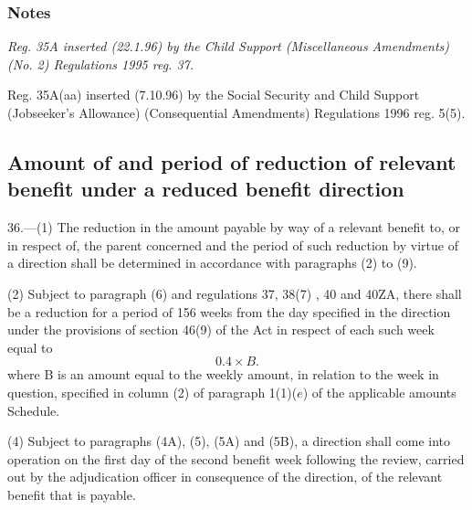 \documentclass[a4paper]{article}
\newcommand\amendment[1]{\subsubsection*{Notes}{\itshape\frenchspacing\footnotesize #1 \par}}
\begin{document}
\amendment{
Reg. 35A inserted (22.1.96) by the Child Support (Miscellaneous Amendments) (No. 2) Regulations 1995 reg. 37.

Reg. 35A(aa) inserted (7.10.96) by the Social Security and Child Support (Jobseeker's Allowance) (Consequential Amendments) Regulations 1996 reg. 5(5).
}

\subsection[36. Amount of and period of reduction of relevant benefit under a reduced benefit direction]{Amount of and period of reduction of relevant benefit under a reduced benefit direction}

36.—(1) The reduction in the amount payable by way of a relevant benefit to, or in respect of, the parent concerned and the period of such reduction by virtue of a direction shall be determined in accordance with paragraphs (2) to (9).

(2) Subject to paragraph (6) and regulations 37, 38(7)%
, 40 and 40ZA,  %
there shall be a reduction for a period of 
156 weeks  %
from the day specified in the direction under the provisions of section 46(9) of the Act in respect of each such week equal to
\[0.4 \times B.\]  %
where B is an amount equal to the weekly amount, in relation to the week in question, specified in column (2) of paragraph 1(1)($e$) of the applicable amounts Schedule.



(4) 
Subject to paragraphs 
(4A),  %
(5), (5A) and (5B),  %
a direction shall come into operation on the first day of the second benefit week following the review, carried out by the adjudication officer in consequence of the direction, of the relevant benefit that is payable.
\end{document}
